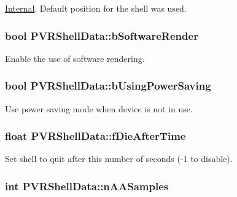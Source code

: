 \hyperlink{struct_internal}{Internal}. Default position for the shell was used. \hypertarget{struct_p_v_r_shell_data_a00023238c5b38ebd6a2da64d61084465}{
\subsubsection[{b\+Software\+Render}]{\setlength{\rightskip}{0pt plus 5cm}bool P\+V\+R\+Shell\+Data\+::b\+Software\+Render}}\label{struct_p_v_r_shell_data_a00023238c5b38ebd6a2da64d61084465}
Enable the use of software rendering. \hypertarget{struct_p_v_r_shell_data_ac0fb0a4fe6f36e7cf6b3aba9340a58c3}{
\subsubsection[{b\+Using\+Power\+Saving}]{\setlength{\rightskip}{0pt plus 5cm}bool P\+V\+R\+Shell\+Data\+::b\+Using\+Power\+Saving}}\label{struct_p_v_r_shell_data_ac0fb0a4fe6f36e7cf6b3aba9340a58c3}
Use power saving mode when device is not in use. \hypertarget{struct_p_v_r_shell_data_af4154e01863950b5ee5d873022ed5ccd}{
\subsubsection[{f\+Die\+After\+Time}]{\setlength{\rightskip}{0pt plus 5cm}float P\+V\+R\+Shell\+Data\+::f\+Die\+After\+Time}}\label{struct_p_v_r_shell_data_af4154e01863950b5ee5d873022ed5ccd}
Set shell to quit after this number of seconds (-\/1 to disable). \hypertarget{struct_p_v_r_shell_data_a5080b2dd00695a9c75d8b548ffad438f}{
\subsubsection[{n\+A\+A\+Samples}]{\setlength{\rightskip}{0pt plus 5cm}int P\+V\+R\+Shell\+Data\+::n\+A\+A\+Samples}}\label{struct_p_v_r_shell_data_a5080b2dd00695a9c75d8b548ffad438f}
